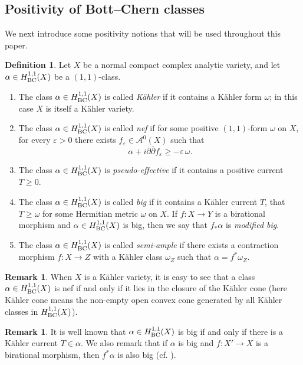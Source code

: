 \documentclass[11pt]{amsart}
\numberwithin{equation}{section}
\theoremstyle{definition}
\theoremstyle{definition}
\theoremstyle{definition}
\newtheorem{definition}[theorem]{Definition}
\newtheorem{remark}[theorem]{Remark}
\begin{document}
\subsection{Positivity of Bott--Chern classes} We next introduce some positivity notions that will be used throughout this paper. 
\begin{definition}
Let $X$ be a normal compact complex analytic variety, and let $\alpha\in H^{1,1}_{\rm{BC}}(X)$ be a $(1,1)$-class. 
\begin{enumerate}
\item The class $\alpha \in H^{1,1}_{\rm{BC}}(X)$
is called \emph{K\"ahler} if it contains a K\"ahler form $\omega$; in this case $X$ is itself a K\"ahler variety.
\item The class $\alpha \in H^{1,1}_{\rm{BC}}(X)$ is called \emph{nef} if for some
positive $(1,1)$-form $\omega$ on $X$, for every $\varepsilon > 0$ there exists
$f_{\varepsilon} \in \mathcal{A}^{0}(X)$ such that
$$
  \alpha + i\partial\bar{\partial} f_{\varepsilon} \geq -\varepsilon\,\omega.
$$
\item The class $\alpha \in H^{1,1}_{\rm{BC}}(X)$ is \emph{pseudo-effective} if it contains
a positive current $T \geq 0$.
\item The class $\alpha \in H^{1,1}_{\rm{BC}}(X)$ is
called \emph{big} if it contains a K\"ahler current $T$, that $T\ge \omega$ for some Hermitian metric $\omega$ on $X$. If $f:X\to Y$ is a birational morphism and $\alpha \in H^{1,1}_{\rm{BC}}(X)$ is big, then we say that $f_*\alpha$ is {\it modified big}. 
\item The class $\alpha \in H^{1,1}_{\rm{BC}}(X)$ is called \textit{semi-ample} if there exists a contraction morphism $f:X\to Z$ with a K\"ahler class $\omega_Z$ such that $\alpha = f^* \omega_Z$.  
\end{enumerate}
\end{definition}
\begin{remark}
When $X$ is a K\"ahler variety, it is easy to see that a class $\alpha \in H^{1,1}_{\rm{BC}}(X)$ 
is nef if and only if it lies in the closure of the K\"ahler cone (here K\"ahler cone means the non-empty open convex cone generated 
by all K\"ahler classes in $H^{1,1}_{\rm{BC}}(X)$).
\end{remark}
\begin{remark}
It is well known that $\alpha \in H^{1,1}_{\rm{BC}}(X)$ is big if and only if there is a K\"ahler current $T\in \alpha$. We also remark that if $\alpha$ is big and $f:X'\to X$ is a birational morphism, then $f^*\alpha$ is also big (cf. \cite[Proposition 2.30]{HLR26}).
\end{remark}
\end{document}
